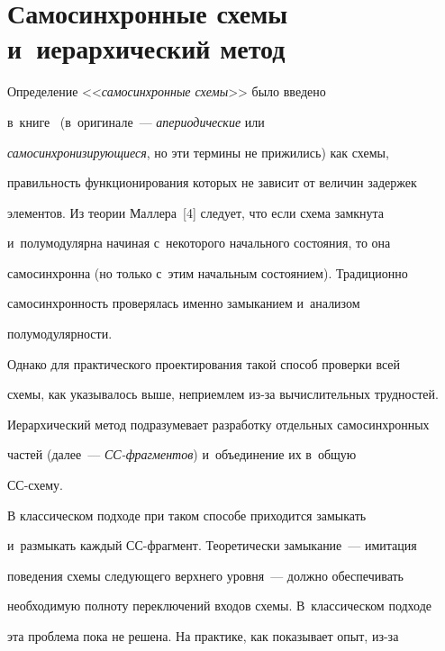 \section{Самосинхронные схемы и~иерархический метод}





\vspace*{-2pt}


       


   Определение <<\textit{самосинхронные схемы}>> было введено 


в~книге~\cite[с.~73]{1-pl} (в~оригинале~--- \textit{апериодические} или 


\textit{самосинхронизирующиеся}, но эти термины не прижились) как схемы, 


правильность функционирования которых не зависит от величин задержек 


элементов. Из теории Маллера~[4] следует, что если схема замкнута 


и~полумодулярна начиная с~некоторого начального состояния, то она 


самосинхронна (но только с~этим начальным состоянием). Традиционно 


самосинхронность проверялась именно замыканием и~анализом 


полумодулярности.


   


   Однако для практического проектирования такой способ проверки всей 


схемы, как указывалось выше, неприемлем из-за вычислительных трудностей. 


Иерархический метод подразумевает разработку отдельных самосинхронных 


частей (далее~--- \textit{СС-фраг\-мен\-тов}) и~объединение их в~общую  


СС-схему.


   


   В классическом подходе при таком способе приходится замыкать 


и~размыкать каждый СС-фраг\-мент. Теоретически замыкание~--- имитация 


поведения схемы следующего верхнего уровня~--- должно обеспечивать 


необходимую полноту переключений входов схемы. В~классическом подходе 


эта проблема пока не решена. На практике, как показывает опыт, из-за 


